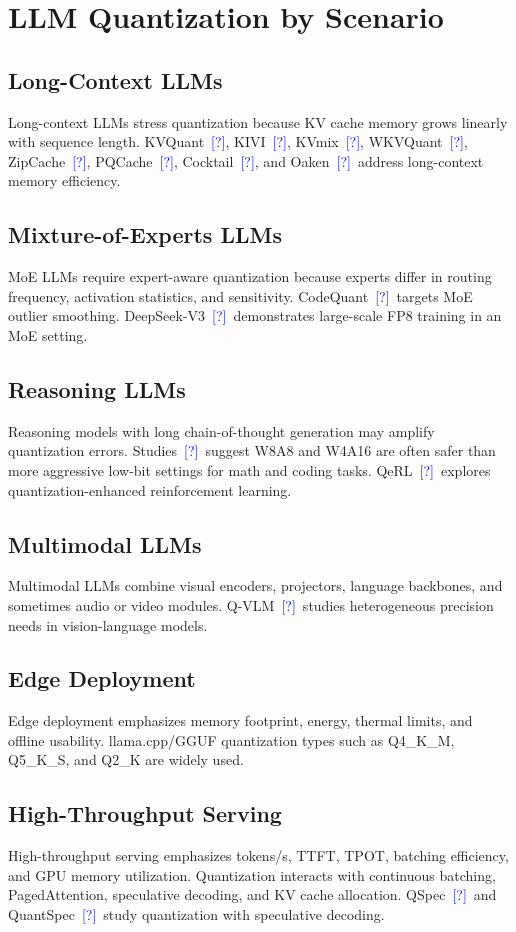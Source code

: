 \documentclass[journal,10pt]{IEEEtran}
\newcommand{\CITE}{\textcolor{blue}{[?]}}
\begin{document}
\section{LLM Quantization by Scenario}

\subsection{Long-Context LLMs}
Long-context LLMs stress quantization because KV cache memory grows linearly with sequence length. KVQuant~\CITE, KIVI~\CITE, KVmix~\CITE, WKVQuant~\CITE, ZipCache~\CITE, PQCache~\CITE, Cocktail~\CITE, and Oaken~\CITE\ address long-context memory efficiency.

\subsection{Mixture-of-Experts LLMs}
MoE LLMs require expert-aware quantization because experts differ in routing frequency, activation statistics, and sensitivity. CodeQuant~\CITE\ targets MoE outlier smoothing. DeepSeek-V3~\CITE\ demonstrates large-scale FP8 training in an MoE setting.

\subsection{Reasoning LLMs}
Reasoning models with long chain-of-thought generation may amplify quantization errors. Studies~\CITE\ suggest W8A8 and W4A16 are often safer than more aggressive low-bit settings for math and coding tasks. QeRL~\CITE\ explores quantization-enhanced reinforcement learning.

\subsection{Multimodal LLMs}
Multimodal LLMs combine visual encoders, projectors, language backbones, and sometimes audio or video modules. Q-VLM~\CITE\ studies heterogeneous precision needs in vision-language models.

\subsection{Edge Deployment}
Edge deployment emphasizes memory footprint, energy, thermal limits, and offline usability. llama.cpp/GGUF quantization types such as Q4\_K\_M, Q5\_K\_S, and Q2\_K are widely used.

\subsection{High-Throughput Serving}
High-throughput serving emphasizes tokens/s, TTFT, TPOT, batching efficiency, and GPU memory utilization. Quantization interacts with continuous batching, PagedAttention, speculative decoding, and KV cache allocation. QSpec~\CITE\ and QuantSpec~\CITE\ study quantization with speculative decoding.
\end{document}
